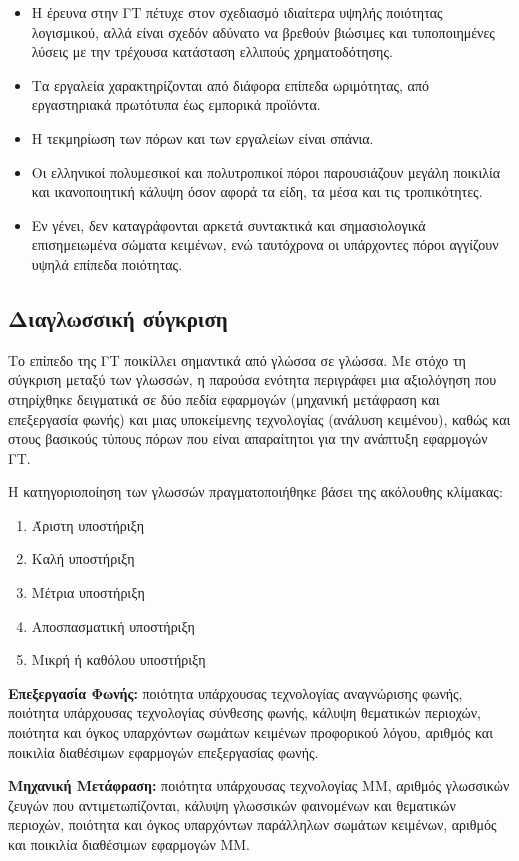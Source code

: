 \begin{multicols}{2}
\begin{itemize}
\item Η έρευνα στην ΓΤ πέτυχε στον σχεδιασμό ιδιαίτερα υψηλής ποιότητας λογισμικού, αλλά είναι σχεδόν αδύνατο να βρεθούν βιώσιμες και τυποποιημένες λύσεις με την τρέχουσα κατάσταση ελλιπούς χρηματοδότησης.
\item Τα εργαλεία χαρακτηρίζονται από διάφορα επίπεδα ωριμότητας, από εργαστηριακά πρωτότυπα έως εμπορικά προϊόντα.
\item Η τεκμηρίωση των πόρων και των εργαλείων είναι σπάνια.
\item Οι ελληνικοί πολυμεσικοί και πολυτροπικοί πόροι παρουσιάζουν μεγάλη ποικιλία και ικανοποιητική κάλυψη όσον αφορά τα είδη, τα μέσα και τις τροπικότητες.
\item Εν γένει, δεν καταγράφονται αρκετά συντακτικά και σημασιολογικά επισημειωμένα σώματα κειμένων, ενώ ταυτόχρονα οι υπάρχοντες πόροι αγγίζουν υψηλά επίπεδα ποιότητας.	
\end{itemize}

\subsection{Διαγλωσσική σύγκριση}

Το επίπεδο της ΓΤ ποικίλλει σημαντικά από γλώσσα σε γλώσσα. Με στόχο τη σύγκριση μεταξύ των γλωσσών, η παρούσα ενότητα περιγράφει μια αξιολόγηση που στηρίχθηκε δειγματικά σε δύο πεδία εφαρμογών (μηχανική μετάφραση και επεξεργασία φωνής) και μιας υποκείμενης τεχνολογίας (ανάλυση κειμένου), καθώς και στους βασικούς τύπους πόρων που είναι απαραίτητοι για την ανάπτυξη εφαρμογών ΓΤ.

Η κατηγοριοποίηση των γλωσσών πραγματοποιήθηκε βάσει της ακόλουθης κλίμακας:

\begin{enumerate}
\item Άριστη υποστήριξη
\item Καλή υποστήριξη
\item Μέτρια υποστήριξη
\item Αποσπασματική υποστήριξη
\item Μικρή ή καθόλου υποστήριξη
\end{enumerate}

\textbf{Επεξεργασία Φωνής:} ποιότητα υπάρχουσας τεχνολογίας αναγνώρισης φωνής, ποιότητα υπάρχουσας τεχνολογίας σύνθεσης φωνής, κάλυψη θεματικών περιοχών, ποιότητα και όγκος υπαρχόντων σωμάτων κειμένων προφορικού λόγου, αριθμός και ποικιλία διαθέσιμων εφαρμογών επεξεργασίας φωνής.

\textbf{Μηχανική Μετάφραση:} ποιότητα υπάρχουσας τεχνολογίας ΜΜ, αριθμός γλωσσικών ζευγών που αντιμετωπίζονται, κάλυψη γλωσσικών φαινομένων και θεματικών περιοχών, ποιότητα και όγκος υπαρχόντων παράλληλων σωμάτων κειμένων, αριθμός και ποικιλία διαθέσιμων εφαρμογών ΜΜ.


\end{multicols}
